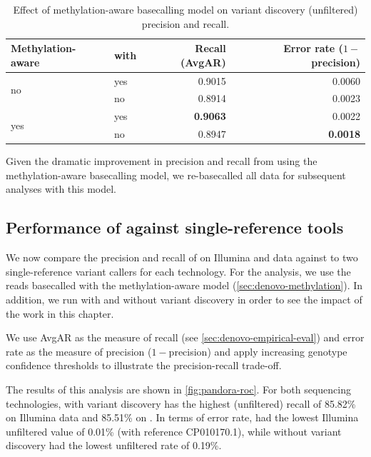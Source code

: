 \begin{table}
\centering
\begin{tabular}{@{}llrr@{}}
\toprule
    Methylation-aware    & with \denovo{} & Recall (AvgAR)  & Error rate ($1-$precision) \\ \midrule
\multirow{2}{*}{no}  & yes                   & 0.9015          & 0.0060                   \\
                     & no                    & 0.8914          & 0.0023                   \\
\multirow{2}{*}{yes} & yes                   & \textbf{0.9063} & 0.0022                   \\
                     & no                    & 0.8947          & \textbf{0.0018}          \\ \cmidrule(l){2-4} 
\end{tabular}
    \caption{Effect of \ont{} methylation-aware basecalling model on \pandora{} \denovo{} variant discovery (unfiltered) precision and recall.}
\label{tab:denovo-methylation}
\end{table}

\noindent
Given the dramatic improvement in precision and recall from using the methylation-aware basecalling model, we re-basecalled all data for subsequent analyses with this model.

\subsection{Performance of \pandora{} against single-reference tools}
\label{sec:pandora-roc-results}

We now compare the precision and recall of \pandora{} on Illumina and \ont{} data against to two single-reference variant callers for each technology. For the \ont{} analysis, we use the reads basecalled with the methylation-aware model (\autoref{sec:denovo-methylation}). In addition, we run \pandora{} with and without \denovo{} variant discovery in order to see the impact of the work in this chapter.

We use AvgAR as the measure of recall (see \autoref{sec:denovo-empirical-eval}) and error rate as the measure of precision ($1-$precision) and apply increasing genotype confidence thresholds to illustrate the precision-recall trade-off. 

The results of this analysis are shown in \autoref{fig:pandora-roc}. For both sequencing technologies, \pandora{} with \denovo{} variant discovery has the highest (unfiltered) recall of 85.82\% on Illumina data and 85.51\% on \ont{}. In terms of error rate,  had the lowest Illumina unfiltered value of 0.01\% (with reference CP010170.1), while \pandora{} without \denovo{} variant discovery had the lowest \ont{} unfiltered rate of 0.19\%. 

